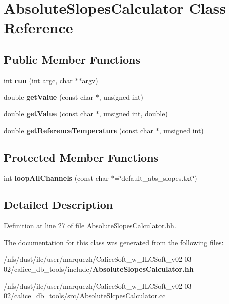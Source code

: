 \section{Absolute\-Slopes\-Calculator Class Reference}
\label{classAbsoluteSlopesCalculator}
\subsection*{Public Member Functions}
\begin{DoxyCompactItemize}
\item 
int {\bfseries run} (int argc, char $\ast$$\ast$argv)\label{classAbsoluteSlopesCalculator_a345f2ce29740c546835b49dbdc7c3926}

\item 
double {\bfseries get\-Value} (const char $\ast$, unsigned int)\label{classAbsoluteSlopesCalculator_a56dcfe26474e72fdaa08900d205dcbe8}

\item 
double {\bfseries get\-Value} (const char $\ast$, unsigned int, double)\label{classAbsoluteSlopesCalculator_a6ef62c250f74c9119b614583e49f9f0c}

\item 
double {\bfseries get\-Reference\-Temperature} (const char $\ast$, unsigned int)\label{classAbsoluteSlopesCalculator_a7cf452eae98f371d9ee96c5b1d7af0e8}

\end{DoxyCompactItemize}
\subsection*{Protected Member Functions}
\begin{DoxyCompactItemize}
\item 
int {\bfseries loop\-All\-Channels} (const char $\ast$=\char`\"{}default\-\_\-abs\-\_\-slopes.\-txt\char`\"{})\label{classAbsoluteSlopesCalculator_ab08e99179823deccae475a4714800a9c}

\end{DoxyCompactItemize}


\subsection{Detailed Description}


Definition at line 27 of file Absolute\-Slopes\-Calculator.\-hh.



The documentation for this class was generated from the following files\-:\begin{DoxyCompactItemize}
\item 
/nfs/dust/ilc/user/marquezh/\-Calice\-Soft\-\_\-w\-\_\-\-I\-L\-C\-Soft\-\_\-v02-\/03-\/02/calice\-\_\-db\-\_\-tools/include/{\bf Absolute\-Slopes\-Calculator.\-hh}\item 
/nfs/dust/ilc/user/marquezh/\-Calice\-Soft\-\_\-w\-\_\-\-I\-L\-C\-Soft\-\_\-v02-\/03-\/02/calice\-\_\-db\-\_\-tools/src/Absolute\-Slopes\-Calculator.\-cc\end{DoxyCompactItemize}
